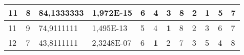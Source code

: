 \documentclass[conference]{IEEEtran}
\begin{document}
\begin{table*}[]
\begin{tabular}{|llll|llllllll|}
\multicolumn{1}{|l|}{11}                                                    & \multicolumn{1}{l|}{8}                                                        & \multicolumn{1}{l|}{84,1333333}                                                   & 1,972E-15                      & \multicolumn{1}{l|}{6}                                                  & \multicolumn{1}{l|}{4}                                                  & \multicolumn{1}{l|}{3}                                                  & \multicolumn{1}{l|}{8}                                                  & \multicolumn{1}{l|}{2}                                                  & \multicolumn{1}{l|}{\textbf{1}}                                         & \multicolumn{1}{l|}{5}                                                  & 7                          \\ \hline
\multicolumn{1}{|l|}{11}                                                    & \multicolumn{1}{l|}{9}                                                        & \multicolumn{1}{l|}{74,9111111}                                                   & 1,495E-13                      & \multicolumn{1}{l|}{5}                                                  & \multicolumn{1}{l|}{4}                                                  & \multicolumn{1}{l|}{\textbf{1}}                                         & \multicolumn{1}{l|}{8}                                                  & \multicolumn{1}{l|}{2}                                                  & \multicolumn{1}{l|}{3}                                                  & \multicolumn{1}{l|}{6}                                                  & 7                          \\ \hline
\multicolumn{1}{|l|}{12}                                                    & \multicolumn{1}{l|}{7}                                                        & \multicolumn{1}{l|}{43,8111111}                                                   & 2,3248E-07                     & \multicolumn{1}{l|}{6}                                                  & \multicolumn{1}{l|}{\textbf{1}}                                         & \multicolumn{1}{l|}{2}                                                  & \multicolumn{1}{l|}{7}                                                  & \multicolumn{1}{l|}{3}                                                  & \multicolumn{1}{l|}{5}                                                  & \multicolumn{1}{l|}{4}                                                  & 8                          \\ \hline

\end{tabular}
\end{table*}
\end{document}
